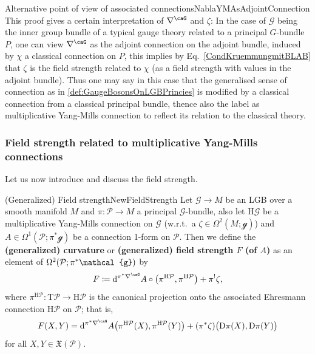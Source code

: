 \documentclass[reqno,a4paper,oneside]{amsart}
\theoremstyle{plain}
\theoremstyle{remark}
\theoremstyle{definition}
\begin{document}
\begin{examples}{Alternative point of view of associated connections}{NablaYMAsAdjointConnection}
This proof gives a certain interpretation of $\nabla^\caG$ and $\zeta$: In the case of $\mathcal{G}$ being the inner group bundle of a typical gauge theory related to a principal $G$-bundle $P$, one can view $\nabla^\caG$ as the adjoint connection on the adjoint bundle, induced by $\chi$ a classical connection on $P$, this implies by Eq.\ \eqref{CondKruemmungmitBLAB} that $\zeta$ is the field strength related to $\chi$ (as a field strength with values in the adjoint bundle). Thus one may say in this case that the generalised sense of connection as in \ref{def:GaugeBosonsOnLGBPrincies} is modified by a classical connection from a classical principal bundle, thence also the label as multiplicative Yang-Mills connection to reflect its relation to the classical theory.
\end{examples}


\subsubsection{Field strength related to multiplicative Yang-Mills connections}

Let us now introduce and discuss the field strength.

\begin{definitions}{(Generalized) Field strength}{NewFieldStrength}
Let $\mathcal{G} \to M$ be an LGB over a smooth manifold $M$ and $\pi\colon\mathcal{P} \to M$ a principal $\mathcal{G}$-bundle, also let $\mathrm{H}\mathcal{G}$ be a multiplicative Yang-Mills connection on $\mathcal{G}$ (w.r.t.\ a $\zeta \in \Omega^2(M; \mathcal{g})$) and $A \in \Omega^1(\mathcal{P}; \pi^*\mathcal{g})$ be a connection 1-form on $\mathcal{P}$. Then we define the \textbf{(generalized) curvature} or \textbf{(generalized) field strength $F$ (of $A$)} as an element of $\Omega^2\mleft( \mathcal{P}; \pi^*\mathcal{g} \mright)$ by
\begin{equation*}
F
\coloneqq
\mathrm{d}^{\pi^*\nabla^\caG} A \circ \mleft( \pi^{\mathrm{H}\mathcal{P}}, \pi^{\mathrm{H}\mathcal{P}} \mright)
	+ \pi^!\zeta,
\end{equation*}
where $\pi^{\mathrm{H}\mathcal{P}}\colon \mathrm{T}\mathcal{P} \to \mathrm{H}\mathcal{P}$ is the canonical projection onto the associated Ehresmann connection $\mathrm{H}\mathcal{P}$ on $\mathcal{P}$; that is,
\begin{equation*}
F(X, Y)
=
\mathrm{d}^{\pi^*\nabla^\caG} A \mleft( \pi^{\mathrm{H}\mathcal{P}}(X), \pi^{\mathrm{H}\mathcal{P}}(Y) \mright)
	+ \mleft(\pi^*\zeta\mright) \bigl( \mathrm{D}\pi(X), \mathrm{D}\pi(Y) \bigr)
\end{equation*}
for all $X, Y \in \mathfrak{X}(\mathcal{P})$.
\end{definitions}
\end{document}
